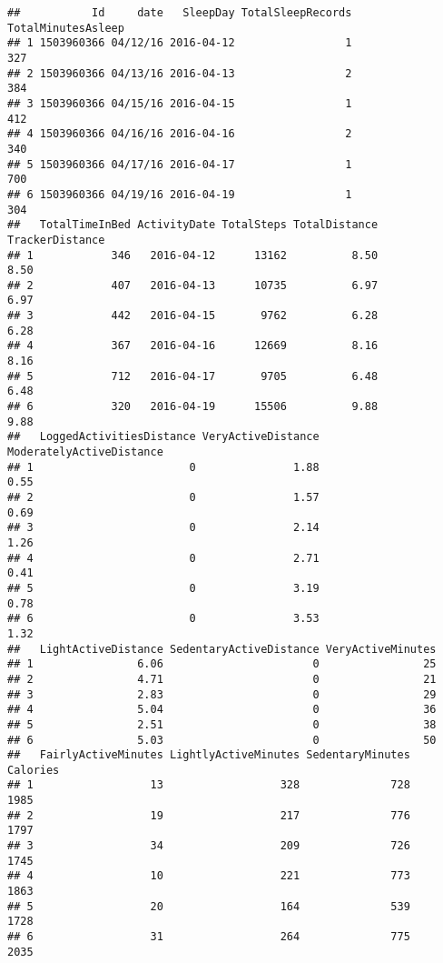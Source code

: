 \documentclass[
]{article}
\begin{document}
\begin{verbatim}
##           Id     date   SleepDay TotalSleepRecords TotalMinutesAsleep
## 1 1503960366 04/12/16 2016-04-12                 1                327
## 2 1503960366 04/13/16 2016-04-13                 2                384
## 3 1503960366 04/15/16 2016-04-15                 1                412
## 4 1503960366 04/16/16 2016-04-16                 2                340
## 5 1503960366 04/17/16 2016-04-17                 1                700
## 6 1503960366 04/19/16 2016-04-19                 1                304
##   TotalTimeInBed ActivityDate TotalSteps TotalDistance TrackerDistance
## 1            346   2016-04-12      13162          8.50            8.50
## 2            407   2016-04-13      10735          6.97            6.97
## 3            442   2016-04-15       9762          6.28            6.28
## 4            367   2016-04-16      12669          8.16            8.16
## 5            712   2016-04-17       9705          6.48            6.48
## 6            320   2016-04-19      15506          9.88            9.88
##   LoggedActivitiesDistance VeryActiveDistance ModeratelyActiveDistance
## 1                        0               1.88                     0.55
## 2                        0               1.57                     0.69
## 3                        0               2.14                     1.26
## 4                        0               2.71                     0.41
## 5                        0               3.19                     0.78
## 6                        0               3.53                     1.32
##   LightActiveDistance SedentaryActiveDistance VeryActiveMinutes
## 1                6.06                       0                25
## 2                4.71                       0                21
## 3                2.83                       0                29
## 4                5.04                       0                36
## 5                2.51                       0                38
## 6                5.03                       0                50
##   FairlyActiveMinutes LightlyActiveMinutes SedentaryMinutes Calories
## 1                  13                  328              728     1985
## 2                  19                  217              776     1797
## 3                  34                  209              726     1745
## 4                  10                  221              773     1863
## 5                  20                  164              539     1728
## 6                  31                  264              775     2035
\end{verbatim}
\end{document}
